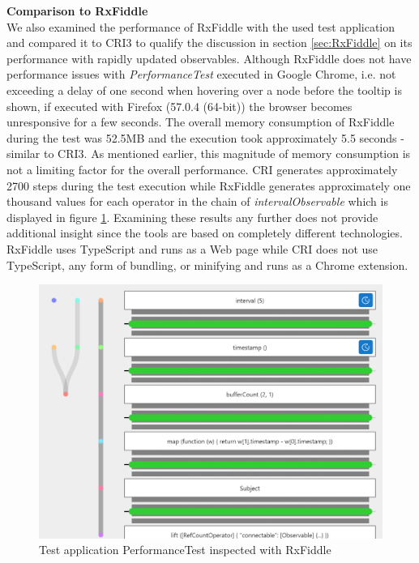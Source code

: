 	\textbf{Comparison to RxFiddle}\\
	We also examined the performance of RxFiddle with the used test application and compared it to CRI3 to qualify the discussion in section \ref{sec:RxFiddle} on its performance with rapidly updated observables.
	Although RxFiddle does not have performance issues  with \emph{PerformanceTest} executed in Google Chrome, i.e. not exceeding a delay of one second when hovering over a node before the tooltip is shown, if executed with Firefox (57.0.4 (64-bit)) the browser becomes unresponsive for a few seconds. The overall memory consumption of RxFiddle during the test was 52.5MB and the execution took approximately 5.5 seconds - similar to CRI3. As mentioned earlier, this magnitude of memory consumption is not a limiting factor for the overall performance. CRI generates approximately 2700 steps during the test execution while RxFiddle generates approximately one thousand values for each operator in the chain of \emph{intervalObservable} which is displayed in figure \ref{fig:RxFiddlePerformance}. Examining these results any further does not provide additional insight since the tools are based on completely different technologies. RxFiddle uses TypeScript and runs as a Web page while CRI does not use TypeScript, any form of bundling, or minifying and runs as a Chrome extension.
	\begin{figure}[!h]
		\centering
		\includegraphics[scale=0.7,trim=0 0 0 0]{gfx/RxFiddleWithTimer.png}
		\caption{Test application PerformanceTest inspected with RxFiddle}
		\label{fig:RxFiddlePerformance}
	\end{figure}
	
